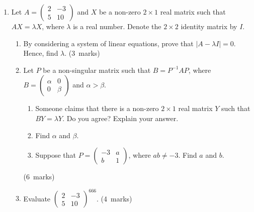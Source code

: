 \documentclass[12pt, a4paper]{article} %
\newcommand{\qmarks}[1]{\leavevmode\unskip\hspace*{\fill}\mbox{(#1 marks)}}
\begin{document}
\begin{enumerate}
    \item Let \(\displaystyle A=\begin{pmatrix}
        2&-3\\
        5&10
    \end{pmatrix}\) and \(X\) be a non-zero \(2\times1\) real matrix such that \(AX=\lambda X\), where \(\lambda\) is a real number. Denote the \(2\times2\) identity matrix by \(I\).
    \begin{enumerate}
        \item By considering a system of linear equations, prove that \(|A-\lambda I|=0\).\\
        Hence, find \(\lambda\). \qmarks{3}
        \item Let \(P\) be a non-singular matrix such that \(B=P^{-1}AP\), where \(\displaystyle B=\begin{pmatrix}
            \alpha&0\\
            0&\beta
        \end{pmatrix}\) and \(\alpha>\beta\).
        \begin{enumerate}[label=(\roman*)]
            \item Someone claims that there is a non-zero \(2\times1\) real matrix \(Y\) such that \(BY=\lambda Y\). Do you  agree? Explain your answer.
            \item Find \(\alpha\) and \(\beta\).
            \item Suppose that \(\displaystyle P=\begin{pmatrix}
                -3&a\\
                b&1
            \end{pmatrix}\), where \(ab \neq-3\). Find \(a\) and \(b\).
        \end{enumerate}\qmarks{6}
        \item Evaluate \(\displaystyle \begin{pmatrix}
            2&-3\\
            5&10
        \end{pmatrix}^{666}\). \qmarks{4}
    \end{enumerate}


\end{enumerate}
\end{document}
